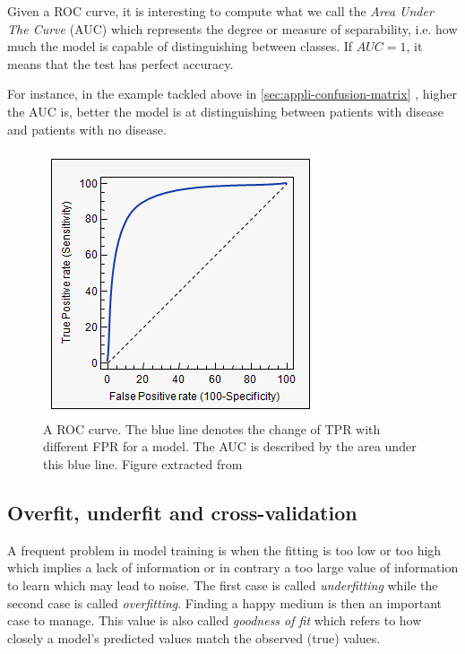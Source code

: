 \documentclass[11pt, openany]{report}
\theoremstyle{plain}
\theoremstyle{definition}
\theoremstyle{remark}
\begin{document}
Given a ROC curve, it is interesting to compute what we call the \textit{Area Under The Curve} (AUC) which represents the degree or measure of separability, i.e. how much the model is capable of distinguishing between classes. If $AUC = 1$, it means that the test has perfect accuracy. 

For instance, in the example tackled above in \autoref{sec:appli-confusion-matrix} , higher the AUC is, better the model is at distinguishing between patients with disease and patients with no disease.

\begin{figure}[h]
  \centering
  \includegraphics[scale=0.8]{figures/roc-curve.png}
  \caption{A ROC curve. The blue line denotes the change of TPR with different FPR for a model. The AUC is described by the area under this blue line. Figure extracted from \cite{roc-schema} }
  \label{fig:roc-curve}
\end{figure}

\newpage
\subsection{Overfit, underfit and cross-validation}
A frequent problem in model training is when the fitting is too low or too high which implies a lack of information or in contrary a too large value of information to learn which may lead to noise. The first case is called \textit{underfitting} while the second case is called \textit{overfitting}. Finding a happy medium is then an important case to manage. This value is also called \textit{goodness of fit} which refers to how closely a model's predicted values match the observed (true) values.
\end{document}
